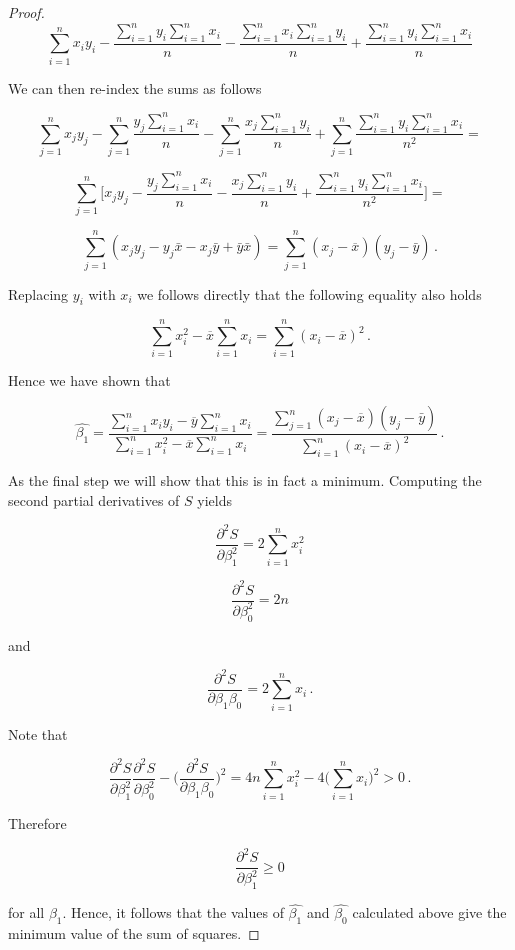 \documentclass[a4paper]{article}
\newcommand{\br} [1] {\overline{#1}}
\numberwithin{equation}{section}
\begin{document}
\begin{description}
\begin{proof}
$$\sum \limits_{i=1}^n x_iy_i - \frac{\sum_{i=1}^ny_i\sum_{i=1}^n x_i}{n} - \frac{\sum_{i=1}^nx_i\sum_{i=1}^n y_i}{n} + \frac{\sum_{i=1}^ny_i\sum_{i=1}^n x_i}{n}$$

We can then re-index the sums as follows

$$\sum \limits_{j=1}^n x_jy_j - \sum\limits_{j=1}^n\frac{y_j \sum_{i=1}^n x_i}{n} - \sum\limits_{j=1}^n\frac{x_j \sum_{i=1}^n y_i}{n} + \sum\limits_{j=1}^n\frac{\sum_{i=1}^ny_i\sum_{i=1}^n x_i}{n^2} = $$

$$\sum \limits_{j=1}^n\Big[ x_jy_j - \frac{y_j \sum_{i=1}^n x_i}{n} - \frac{x_j \sum_{i=1}^n y_i}{n} + \frac{\sum_{i=1}^ny_i\sum_{i=1}^n x_i}{n^2}\Big] = $$

$$\sum \limits_{j=1}^n( x_jy_j - y_j\bar{x} - x_j\bar{y}+ \bar{y}\bar{x}) = \sum \limits_{j=1}^n( x_j - \br{x})(y_j - \bar{y})\,.$$

Replacing $y_i$ with $x_i$ we follows directly that the following equality also holds

$$\sum_{i=1}^n x_i^2 - \br{x}\sum_{i=1}^n x_i = \sum_{i=1}^n (x_i - \br{x})^2\,.$$

Hence we have shown that

$$\hat{\beta_1} = \frac{\sum_{i=1}^n x_iy_i - \br{y}\sum_{i=1}^n x_i}{\sum_{i=1}^n x_i^2 - \br{x}\sum_{i=1}^n x_i} = \frac{\sum_{j=1}^n( x_j - \br{x})(y_j - \bar{y})}{\sum_{i=1}^n (x_i - \br{x})^2}\,.$$

As the final step we will show that this is in fact a minimum. Computing the second partial derivatives of $S$ yields

$$\frac{\partial^2 S}{\partial \beta_1^2} = 2\sum \limits_{i=1}^n x_i^2$$

$$\frac{\partial^2 S}{\partial \beta_0^2} = 2n$$

and

$$\frac{\partial^2 S}{\partial \beta_1\beta_0} = 2\sum \limits_{i=1}^n x_i\,.$$

Note that 

$$\frac{\partial^2 S}{\partial \beta_1^2}\frac{\partial^2 S}{\partial \beta_0^2} - \Big(\frac{\partial^2 S}{\partial \beta_1\beta_0}\Big)^2 =  4n\sum \limits_{i=1}^n x_i^2 - 4\Big(\sum \limits_{i=1}^n x_i\Big)^2 > 0\,.$$

Therefore

$$\frac{\partial^2 S}{\partial \beta_1^2} \geq 0$$

for all $\beta_1$. Hence, it follows that the values of $\hat{\beta_1}$ and $\hat{\beta_0}$ calculated above give the minimum value of the sum of squares. 


\end{proof}
\end{description}
\end{document}
